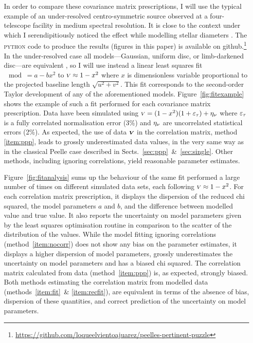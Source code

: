 \documentclass{pasa}
\begin{document}
In order to compare these covariance matrix prescriptions, I will use the typical example of an under-resolved centro-symmetric source observed at a four-telescope facility in medium spectral resolution. It is close to the context under which I serendipitiously noticed the effect while modelling stellar diameters \citep[see][]{LAC19}. The \textsc{python} code to produce the results (figures in this paper) is available on github.\footnote{\url{https://github.com/loqueelvientoajuarez/peelles-pertinent-puzzle}} In the under-resolved case all models---Gaussian, uniform disc, or limb-darkened disc---are equivalent \citep{LAC03}, so I will use instead a linear least squares fit $\mod = a - bx^2$ to ${\scriptstyle V} \approx 1 - x^2$ where $x$ is dimensionless variable proportional to the projected baseline length $\sqrt{u^2+v^2}$. This fit corresponds to the second-order Taylor development of any of the aforementioned models.  Figure~\ref{fig:fitexample} shows the example of such a fit performed for each covariance matrix prescription.  Data have been simulated using ${\scriptstyle V} = (1-x^2)(1 + \varepsilon_\tau) + \eta_\nu$ where $\varepsilon_\tau$ is a fully correlated normalisation error (3\%) and $\eta_\nu$ are uncorrelated statistical errors (2\%). As expected, the use of data $\boldsymbol{{\scriptstyle V}}$ in the correlation matrix, method \ref{item:ppp}, leads to grossly underestimated data values, in the very same way as in the classical Peelle case described in Sects.~\ref{sec:ppp}~\&~\ref{sec:single}.  Other methods, including ignoring correlations, yield reasonable parameter estimates.

Figure~\ref{fig:fitanalysis} sums up the behaviour of the same fit performed a large number of times on different simulated data sets, each following ${\scriptstyle V} \approx 1-x^2$.  For each correlation matrix prescription, it displays the dispersion of the reduced chi squared, the model parameters $a$ and $b$, and the difference between modelled value and true value. It also reports the uncertainty on model parameters given by the least squares optimisation routine in comparison to the scatter of the distribution of the values. While the model fitting ignoring correlations (method~\ref{item:nocorr}) does not show any bias on the parameter estimates, it displays a higher dispersion of model parameters,  grossly underestimates the uncertainty on model parameters and has a biased chi squared.  The correlation matrix calculated from data (method~\ref{item:ppp}) is, as expected, strongly biased. Both methods estimating the correlation  matrix from modelled data (methods~\ref{item:fit}~\& \ref{item:recfit}), are equivalent in terms of the absence of bias, dispersion of these quantities, and correct prediction of the uncertainty on model parameters.
\end{document}
